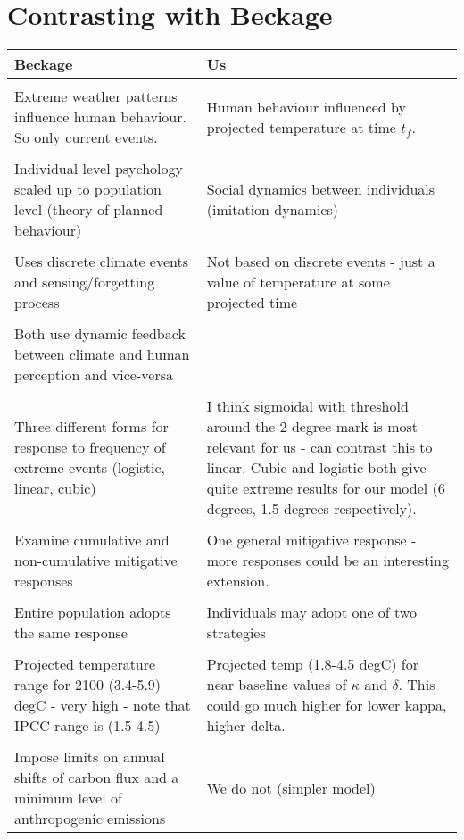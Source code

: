 \documentclass[10pt]{article} %
\begin{document}
\section{Contrasting with Beckage}


\begin{table}[H]
\centering
\begin{tabular}{m{25em}|m{25em}}
\textbf{Beckage} & \textbf{Us}\\
\hline\\
Extreme weather patterns influence human behaviour. So only current events. & Human behaviour influenced by projected temperature at time $t_f$. \\
& \\
Individual level psychology scaled up to population level (theory of planned behaviour) &  Social dynamics between individuals (imitation dynamics)\\
& \\
Uses discrete climate events and sensing/forgetting process & Not based on discrete events - just a value of temperature at some projected time\\
& \\
Both use dynamic feedback between climate and human perception and vice-versa & \\
& \\
Three different forms for response to frequency of extreme events (logistic, linear, cubic) & I think sigmoidal with threshold around the 2 degree mark is most relevant for us - can contrast this to linear. Cubic and logistic both give quite extreme results for our model (6 degrees, 1.5 degrees respectively).  \\
& \\
Examine cumulative and non-cumulative mitigative responses & One general mitigative response - more responses could be an interesting extension. \\
& \\
Entire population adopts the same response & Individuals may adopt one of two strategies \\
& \\
Projected temperature range for 2100 (3.4-5.9) degC - very high - note that IPCC range is (1.5-4.5) & Projected temp (1.8-4.5 degC) for near baseline values of $\kappa$ and $\delta$. This could go much higher for lower kappa, higher delta. \\
& \\
Impose limits on annual shifts of carbon flux and a minimum level of anthropogenic emissions & We do not (simpler model) \\

\end{tabular}
\end{table}
\end{document}
